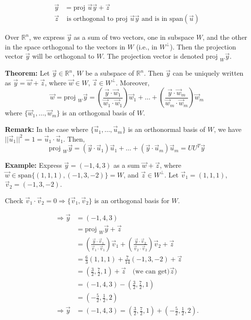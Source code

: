 \documentclass{article}
\begin{document}
\begin{align*}
\vec{y} &= \text{proj } \vec{u} \vec{y} + \vec{z} \\
\vec{z} & \text{ is orthogonal to } \text{proj } \vec{u} \vec{y} \text{ and is in span}(\vec{u})
\end{align*}

Over $\mathbb{R}^n$, we express $\vec{y}$ as a sum of two vectors, one in subspace $W$, and the other in the space orthogonal to the vectors in $W$ (i.e., in $W^{\perp}$). Then the projection vector $\vec{y}$ will be orthogonal to $W$. The projection vector is denoted $\text{proj }_W\vec{y}$.

\textbf{Theorem:} Let $\vec{y} \in \mathbb{R}^n$, $W$ be a subspace of $\mathbb{R}^n$. Then $\vec{y}$ can be uniquely written as $\vec{y} = \vec{w} + \vec{z}$, where $\vec{w} \in W$, $\vec{z} \in W^{\perp}$. Moreover,
\[
\vec{w} = \text{proj }_W \vec{y} = \left( \frac{\vec{y} \cdot \vec{w}_1}{\vec{w}_1 \cdot \vec{w}_1} \right) \vec{w}_1 + \ldots + \left( \frac{\vec{y} \cdot \vec{w}_m}{\vec{w}_m \cdot \vec{w}_m} \right) \vec{w}_m
\]
where $\{\vec{w}_1, \ldots, \vec{w}_m\}$ is an orthogonal basis of $W$.

\textbf{Remark:} In the case where $\{\vec{u}_1, \ldots, \vec{u}_m\}$ is an orthonormal basis of $W$, we have $||\vec{u}_1||^2 = 1 = \vec{u}_1 \cdot \vec{u}_1$. Then,
\[
\text{proj }_W\vec{y} = (\vec{y} \cdot \vec{u}_1)\vec{u}_1 + \ldots + (\vec{y} \cdot \vec{u}_m)\vec{u}_m = UU^T\vec{y}
\]

\textbf{Example:} Express $\vec{y} = (-1, 4, 3)$ as a sum $\vec{w} + \vec{z}$, where $\vec{w} \in \text{span}\{ (1, 1, 1), (-1, 3, -2)\} = W$, and $\vec{z} \in W^{\perp}$. Let $\vec{v}_1 = (1, 1, 1)$, $\vec{v}_2 = (-1, 3, -2)$.

Check $\vec{v}_1 \cdot \vec{v}_2 = 0 \Rightarrow \{\vec{v}_1, \vec{v}_2\}$ is an orthogonal basis for $W$.

\[
\begin{aligned}
\Rightarrow \vec{y} &= (-1, 4, 3) \\
&= \text{proj }_W \vec{y} + \vec{z} \\
&= \left( \frac{\vec{y} \cdot \vec{v}_1}{\vec{v}_1 \cdot \vec{v}_1} \right) \vec{v}_1 + \left( \frac{\vec{y} \cdot \vec{v}_2}{\vec{v}_2 \cdot \vec{v}_2} \right) \vec{v}_2 + \vec{z} \\
&= \frac{6}{3}(1,1,1) + \frac{7}{14}(-1,3,-2) + \vec{z} \\
&= \left( \frac{3}{2}, \frac{7}{2}, 1 \right) + \vec{z} \quad \text{(we can get)} \vec{z}) \\
&= (-1, 4, 3) - \left( \frac{3}{2}, \frac{7}{2}, 1 \right) \\
&= \left( -\frac{5}{2}, \frac{1}{2}, 2 \right) \\
\Rightarrow \vec{y} &= (-1, 4, 3) = \left( \frac{3}{2}, \frac{7}{2}, 1 \right) + \left( -\frac{5}{2}, \frac{1}{2}, 2 \right).
\end{aligned}
\]
\end{document}
